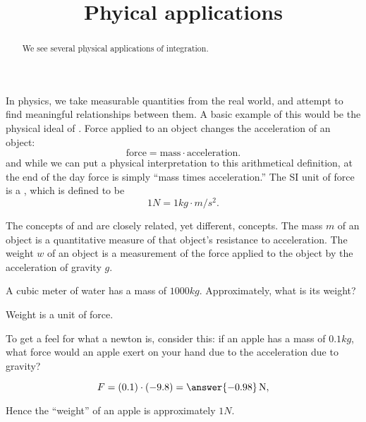 \documentclass{ximera}
\title[Dig-In:]{Phyical applications}
\begin{document}
\begin{abstract}
We see several physical applications of integration.
\end{abstract}
\maketitle

In physics, we take measurable quantities from the real world, and
attempt to find meaningful relationships between them. A basic example
of this would be the physical ideal of . Force applied to
an object changes the acceleration of an object:
\[
\mathrm{force} = \mathrm{mass} \cdot \mathrm{acceleration}.
\]
and while we can put a physical interpretation to this arithmetical
definition, at the end of the day force is simply ``mass times
acceleration.'' The SI unit of force is a , which is
defined to be
\[
1\unit{N} = 1\unit{kg}\cdot \unit{m}/\unit{s}^2. 
\]

\begin{warning}
  The concepts of  and  are closely related, yet
  different, concepts. The mass $m$ of an object is a quantitative
  measure of that object's resistance to acceleration. The weight $w$
  of an object is a measurement of the force applied to the object by
  the acceleration of gravity $g$.
\end{warning}

\begin{question}
  A cubic meter of water has a mass of $1000\unit{kg}$. Approximately,
  what is its weight?
  \begin{multipleChoice}
  \end{multipleChoice}
  \begin{feedback}
    Weight is a unit of force.
  \end{feedback}
\end{question}


\begin{question}
  To get a feel for what a newton is, consider this: if an apple has a
  mass of $0.1\unit{kg}$, what force would an apple exert on your hand
  due to the acceleration due to gravity?
  \begin{prompt}
  \[
  F = (0.1) \cdot (-9.8) = \answer{-0.98}\unit{N},
  \]
  \end{prompt}
\begin{feedback}
  Hence the ``weight'' of an apple is approximately $1\unit{N}$.
\end{feedback}
\end{question}
\end{document}
